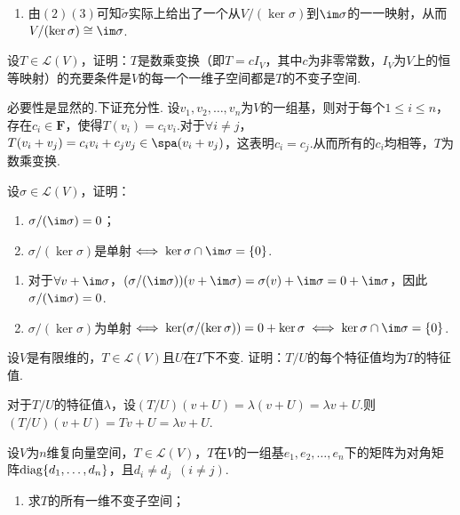 \begin{exercise}
\begin{exgroup}
\begin{answer}
\begin{enumerate}
                对于$\forall v=\im(w) \in\im\sigma$，$v=\sigma(w)=\widetilde{\sigma}(w+\ker\sigma)\in\im\widetilde{\sigma}$，从而$\im\sigma\subseteq \im \widetilde{\sigma}$.综上有$\im \widetilde{\sigma}=\im\sigma$.
                \item 由$(2)(3)$可知$\widetilde{\sigma}$实际上给出了一个从$V/(\ker \sigma)$到$\im\sigma$的一一映射，从而$V/(\ker\sigma)\cong \im\sigma$.
            \end{enumerate}
        \end{answer}
        \item 设$T\in \mathcal{L}(V)$，证明：$T$是数乘变换（即$T=cI_V$，其中$c$为非零常数，$I_V$为$V$上的恒等映射）的充要条件是$V$的每一个一维子空间都是$T$的不变子空间.
        \begin{answer}
            必要性是显然的.下证充分性.
            设$v_1,v_2,\ldots,v_n$为$V$的一组基，则对于每个$1\leqslant i \leqslant n$，存在$c_i\in \mathbf{F}$，使得$T(v_i)=c_iv_i$.对于$\forall i\neq j$，$T(v_i+v_j)=c_iv_i+c_jv_j\in \spa(v_i+v_j)$，这表明$c_i=c_j$.从而所有的$c_i$均相等，$T$为数乘变换.
        \end{answer}

        \item 设$\sigma\in \mathcal{L}(V)$，证明：
        \begin{enumerate}
            \item $\sigma/(\im \sigma)=0$；

            \item $\sigma/(\ker \sigma)$是单射$\iff \ker \sigma\cap\im \sigma=\{0\}$.
        \end{enumerate}
        \begin{answer}
            \begin{enumerate}
                \item 对于$\forall v+\im\sigma$，$(\sigma/(\im\sigma))(v+\im\sigma)=\sigma(v)+\im\sigma=0+\im\sigma$，因此$\sigma/(\im\sigma)=0$.
                \item $\sigma/(\ker\sigma)$为单射$\iff \ker(\sigma/(\ker\sigma))=0+\ker\sigma\iff \ker\sigma\cap\im\sigma=\{0\}$.
            \end{enumerate}

        \end{answer}
        \item 设$V$是有限维的，$T\in \mathcal{L}(V)$且$U$在$T$下不变. 证明：$T/U$的每个特征值均为$T$的特征值.
        \begin{answer}
            对于$T/U$的特征值$\lambda$，设$(T/U)(v+U)=\lambda(v+U)=\lambda v+U$.则$(T/U)(v+U)=Tv+U=\lambda v+U$.
        \end{answer}
        \item 设$V$为$n$维复向量空间，$T\in \mathcal{L}(V)$，$T$在$V$的一组基$e_1,e_2,\ldots,e_n$下的矩阵为对角矩阵$\operatorname{diag}\{d_1,\ldots,d_n\}$，且$d_i\neq d_j\enspace(i\neq j)$.
        \begin{enumerate}
            \item 求$T$的所有一维不变子空间；


\end{enumerate}
\end{exgroup}
\end{exercise}
